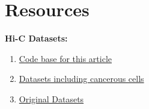 \documentclass[a4,center,fleqn]{NAR}
\begin{document}
\section{Resources}
\textbf{Hi-C Datasets:}
\begin{enumerate}
    \item \href{https://github.com/rasoolianbehnam/watson}{Code base for this article}
    \item \href{http://sysbio.rnet.missouri.edu/T0510/tmp_download/link_to_download_genome_data/}
        {Datasets including cancerous cells}
    \item \href{https://bcm.app.box.com/v/aidenlab/folder/11234760671}{Original Datasets}
\end{enumerate}



\end{document}

